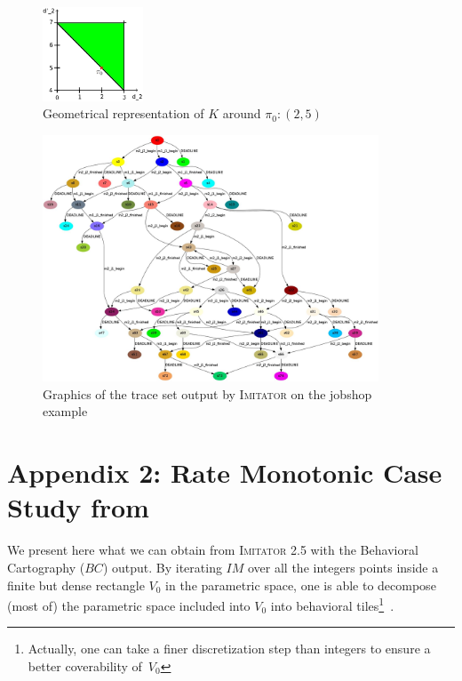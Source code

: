 \documentclass{llncs}
\newcommand{\Ko}{K}
\newcommand{\pio}{\pi_0}
\newcommand{\IM}{\mathit{IM}}
\newcommand{\BC}{\mathit{BC}}
\newcommand{\imitator}{\textsc{Imitator}}
\newcommand{\commentaire}[1]{\textcolor{red}{\textbf{$\Leftarrow$  #1 $\Rightarrow$}}}
\begin{document}
\begin{figure}[ht!]
	\centering
 		\includegraphics[width=3cm]{./figures/geom.jpg}
	\caption{Geometrical representation of $\Ko$ around $\pio: (2,5)$}
	\label{fig:geom}
\end{figure}

\begin{figure}[ht!]
	\centering
 		\includegraphics[width=10cm]{./figures/traceset.jpg}
	\caption{Graphics of the trace set output by \imitator{} on the jobshop example}
	\label{fig:output}
\end{figure}




\section*{Appendix 2: Rate Monotonic Case Study from \cite{bb04}}
\label{app:carto}
We present here what we can obtain from \imitator{} 2.5 with the Behavioral Cartography ($\BC$) output. By iterating $\IM$ over all the integers points %
inside a finite but dense rectangle $V_0$ in the parametric space, one is able to decompose (most of) the parametric space included into $V_0$ into behavioral tiles\footnote{Actually, one can take a finer discretization step than integers to ensure a better coverability of~$V_0$}~\cite{af10}.
\end{document}
